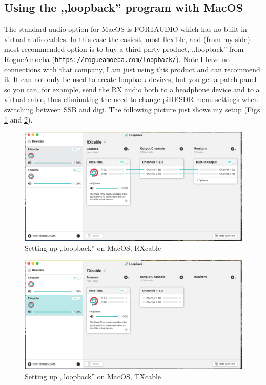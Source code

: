 \documentclass[12pt]{book}
\def\pH{pi\-HPSDR }
\begin{document}
\subsection[MacOS: LoopBack]{Using the ,,loopback'' program with MacOS}
The standard audio option for MacOS is PORTAUDIO which has no built-in virtual
audio cables. In this case
the easiest, most flexible, and (from my side) most recommended option is
to buy a third-party product,  ,,loopback'' from RogueAmoeba
(\texttt{https://rogueamoeba.com/loopback/}).
Note I have no connections with that company, I am just using this product and
can recommend it. It can not only be used to create loopback devices, but you get
a patch panel so you can, for example, send the RX audio both to a headphone device
and to a virtual cable, thus eliminating the need to change \pH menu settings
when switching between SSB and digi. The following picture just shows my setup
(Figs. \ref{fig:loopback_rx} and \ref{fig:loopback_tx}).

\begin{figure}[ht!]
\center
\includegraphics[width=12cm]{loopback_rx.png}
\caption{Setting up ,,loopback'' on MacOS, RXcable}
\label{fig:loopback_rx}
\end{figure}

\begin{figure}[ht!]
\center
\includegraphics[width=12cm]{loopback_tx.png}
\caption{Setting up ,,loopback'' on MacOS, TXcable}
\label{fig:loopback_tx}
\end{figure}
\end{document}
